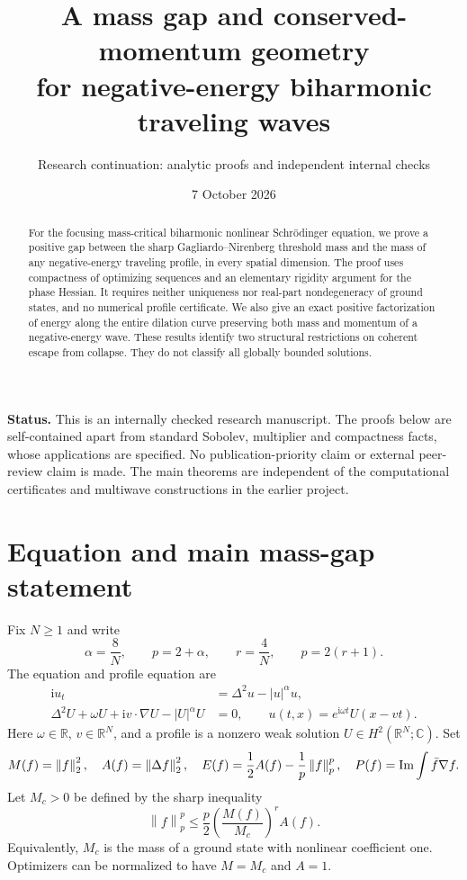 \documentclass[11pt,a4paper]{article}
\title{A mass gap and conserved-momentum geometry\\for negative-energy biharmonic traveling waves}
\author{Research continuation: analytic proofs and independent internal checks}
\date{7 October 2026}
\theoremstyle{remark}\newtheorem{remark}[theorem]{Remark}
\newcommand{\R}{\mathbb R}\newcommand{\C}{\mathbb C}
\newcommand{\ii}{\mathrm i}\newcommand{\dd}{\,\mathrm d}
\newcommand{\norm}[1]{\left\|#1\right\|}
\begin{document}
\maketitle
\begin{abstract}
For the focusing mass-critical biharmonic nonlinear Schr\"odinger equation, we prove a positive gap between the sharp Gagliardo--Nirenberg threshold mass and the mass of any negative-energy traveling profile, in every spatial dimension. The proof uses compactness of optimizing sequences and an elementary rigidity argument for the phase Hessian. It requires neither uniqueness nor real-part nondegeneracy of ground states, and no numerical profile certificate. We also give an exact positive factorization of energy along the entire dilation curve preserving both mass and momentum of a negative-energy wave. These results identify two structural restrictions on coherent escape from collapse. They do not classify all globally bounded solutions.
\end{abstract}
\noindent\textbf{Status.} This is an internally checked research manuscript. The proofs below are self-contained apart from standard Sobolev, multiplier and compactness facts, whose applications are specified. No publication-priority claim or external peer-review claim is made. The main theorems are independent of the computational certificates and multiwave constructions in the earlier project.

\section{Equation and main mass-gap statement}
Fix $N\ge1$ and write
\[
 \alpha=\frac8N,\qquad p=2+\alpha,\qquad r=\frac4N,
 \qquad p=2(r+1).
\]
The equation and profile equation are
\begin{align}
 \ii u_t&=\Delta^2u-|u|^\alpha u,\label{eq:pde}\\
 \Delta^2U+\omega U+\ii v\cdot\nabla U-|U|^\alpha U&=0,
 \qquad u(t,x)=e^{\ii\omega t}U(x-vt).\label{eq:profile}
\end{align}
Here $\omega\in\R$, $v\in\R^N$, and a profile is a nonzero weak solution $U\in H^2(\R^N;\C)$. Set
\[
 M(f)=\norm f_2^2,\quad A(f)=\norm{\Delta f}_2^2,\quad
 E(f)=\frac12 A(f)-\frac1p\norm f_p^p,\quad
 P(f)=\Ima\int\bar f\nabla f.
\]
Let $M_c>0$ be defined by the sharp inequality
\begin{equation}\label{eq:gn}
 \norm f_p^p\le\frac p2\left(\frac{M(f)}{M_c}\right)^r A(f).
\end{equation}
Equivalently, $M_c$ is the mass of a ground state with nonlinear coefficient one. Optimizers can be normalized to have $M=M_c$ and $A=1$.
\end{document}

